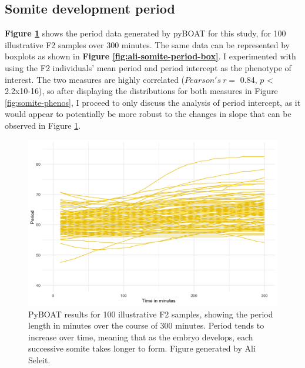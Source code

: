\documentclass[
]{book}
\begin{document}
\hypertarget{somite-development-period}{%
\subsection{Somite development period}\label{somite-development-period}}

\textbf{Figure \ref{fig:ali-somite-period-lines}} shows the period data generated by pyBOAT for this study, for 100 illustrative F2 samples over 300 minutes. The same data can be represented by boxplots as shown in \textbf{Figure \ref{fig:ali-somite-period-box}}. I experimented with using the F2 individuals' mean period and period intercept as the phenotype of interest. The two measures are highly correlated (\(Pearson's~r =\) 0.84, \(p\) \textless{} 2.2x10-16), so after displaying the distributions for both measures in Figure \ref{fig:somite-phenos}, I proceed to only discuss the analysis of period intercept, as it would appear to potentially be more robust to the changes in slope that can be observed in Figure \ref{fig:ali-somite-period-lines}.



\begin{figure}
\includegraphics[width=1\linewidth]{figs/somites/ali_period_lines_100fish300mins} \caption{PyBOAT results for 100 illustrative F2 samples, showing the period length in minutes over the course of 300 minutes. Period tends to increase over time, meaning that as the embryo develops, each successive somite takes longer to form. Figure generated by Ali Seleit.}\label{fig:ali-somite-period-lines}
\end{figure}
\end{document}
